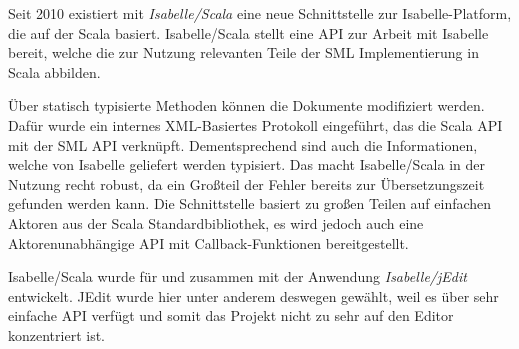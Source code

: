 Seit 2010 existiert mit \textit{Isabelle/Scala} eine neue Schnittstelle zur Isabelle-Platform, die
auf der Scala basiert. Isabelle/Scala stellt eine API zur Arbeit mit Isabelle bereit, welche die zur
Nutzung relevanten Teile der SML Implementierung in Scala abbilden. \cite{iscala}

Über statisch typisierte Methoden können die Dokumente modifiziert werden. Dafür wurde ein internes
XML-Basiertes Protokoll eingeführt, das die Scala API mit der SML API verknüpft. Dementsprechend
sind auch die Informationen, welche von Isabelle geliefert werden typisiert. Das macht
Isabelle/Scala in der Nutzung recht robust, da ein Großteil der Fehler bereits zur Übersetzungszeit
gefunden werden kann. Die Schnittstelle basiert zu großen Teilen auf einfachen Aktoren aus der Scala
Standardbibliothek, es wird jedoch auch eine Aktorenunabhängige API mit Callback-Funktionen
bereitgestellt.

Isabelle/Scala wurde für und zusammen mit der Anwendung \textit{Isabelle/jEdit} entwickelt. JEdit
wurde hier unter anderem deswegen gewählt, weil es über sehr einfache API verfügt und somit das
Projekt nicht zu sehr auf den Editor konzentriert ist.

